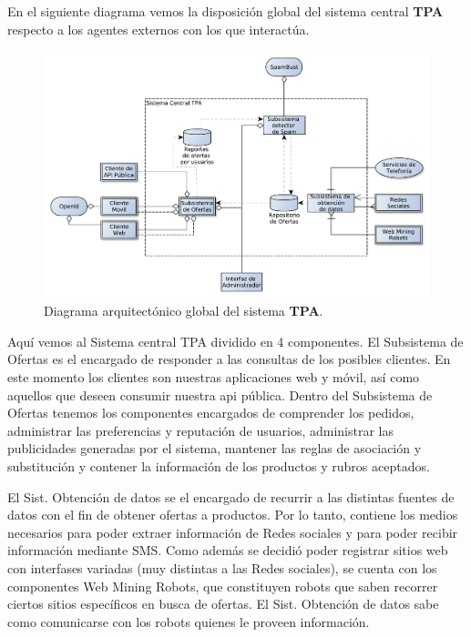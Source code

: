 En el siguiente diagrama vemos la disposición global del sistema central \textbf{TPA} respecto a los agentes externos con los que interactúa. 

\begin{figure}[H]
	\centering
	\includegraphics[width=\textwidth]{graficos/arch/global_overview.pdf}
	\caption{Diagrama arquitectónico global del sistema \textbf{TPA}.}
\end{figure}

Aquí vemos al \textsf{Sistema central TPA} dividido en 4 componentes. El \textsf{Subsistema de Ofertas} es el encargado de responder a las consultas de los posibles clientes. En este momento los clientes son nuestras aplicaciones web y móvil, así como aquellos que deseen consumir nuestra api pública. Dentro del \textsf{Subsistema de Ofertas} tenemos los componentes encargados de comprender los pedidos, administrar las preferencias y reputación de usuarios, administrar las publicidades generadas por el sistema, mantener las reglas de asociación y substitución y contener la información de los productos y rubros aceptados.

El \textsf{Sist. Obtención de datos} se el encargado de recurrir a las distintas fuentes de datos con el fin de obtener ofertas a productos. Por lo tanto, contiene los medios necesarios para poder extraer información de \textsf{Redes sociales} y para poder recibir información mediante \textsf{SMS}. Como además se decidió poder registrar sitios web con interfases variadas (muy distintas a las \textsf{Redes sociales}), se cuenta con los componentes \textsf{Web Mining Robots}, que constituyen robots que saben recorrer ciertos sitios específicos en busca de ofertas. El \textsf{Sist. Obtención de datos} sabe como comunicarse con los robots quienes le proveen información. 

